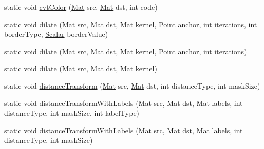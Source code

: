 \begin{DoxyCompactItemize}
static void \mbox{\hyperlink{classorg_1_1opencv_1_1imgproc_1_1_imgproc_ac8a27791c4cc1d1739464acafa3efff6}{cvt\+Color}} (\mbox{\hyperlink{classorg_1_1opencv_1_1core_1_1_mat}{Mat}} src, \mbox{\hyperlink{classorg_1_1opencv_1_1core_1_1_mat}{Mat}} dst, int code)
\item 
static void \mbox{\hyperlink{classorg_1_1opencv_1_1imgproc_1_1_imgproc_a7ed226f2562750987d756b129d3820b2}{dilate}} (\mbox{\hyperlink{classorg_1_1opencv_1_1core_1_1_mat}{Mat}} src, \mbox{\hyperlink{classorg_1_1opencv_1_1core_1_1_mat}{Mat}} dst, \mbox{\hyperlink{classorg_1_1opencv_1_1core_1_1_mat}{Mat}} kernel, \mbox{\hyperlink{classorg_1_1opencv_1_1core_1_1_point}{Point}} anchor, int iterations, int border\+Type, \mbox{\hyperlink{classorg_1_1opencv_1_1core_1_1_scalar}{Scalar}} border\+Value)
\item 
static void \mbox{\hyperlink{classorg_1_1opencv_1_1imgproc_1_1_imgproc_a8f79b910d1d1066ca305b6d1fd86daf0}{dilate}} (\mbox{\hyperlink{classorg_1_1opencv_1_1core_1_1_mat}{Mat}} src, \mbox{\hyperlink{classorg_1_1opencv_1_1core_1_1_mat}{Mat}} dst, \mbox{\hyperlink{classorg_1_1opencv_1_1core_1_1_mat}{Mat}} kernel, \mbox{\hyperlink{classorg_1_1opencv_1_1core_1_1_point}{Point}} anchor, int iterations)
\item 
static void \mbox{\hyperlink{classorg_1_1opencv_1_1imgproc_1_1_imgproc_a596d70c952e5431f7703dc4e17eccf94}{dilate}} (\mbox{\hyperlink{classorg_1_1opencv_1_1core_1_1_mat}{Mat}} src, \mbox{\hyperlink{classorg_1_1opencv_1_1core_1_1_mat}{Mat}} dst, \mbox{\hyperlink{classorg_1_1opencv_1_1core_1_1_mat}{Mat}} kernel)
\item 
static void \mbox{\hyperlink{classorg_1_1opencv_1_1imgproc_1_1_imgproc_a2677a973693b8af87cf9c37e4e6bb55b}{distance\+Transform}} (\mbox{\hyperlink{classorg_1_1opencv_1_1core_1_1_mat}{Mat}} src, \mbox{\hyperlink{classorg_1_1opencv_1_1core_1_1_mat}{Mat}} dst, int distance\+Type, int mask\+Size)
\item 
static void \mbox{\hyperlink{classorg_1_1opencv_1_1imgproc_1_1_imgproc_a5f09765bfd6488e72af786bedf84debb}{distance\+Transform\+With\+Labels}} (\mbox{\hyperlink{classorg_1_1opencv_1_1core_1_1_mat}{Mat}} src, \mbox{\hyperlink{classorg_1_1opencv_1_1core_1_1_mat}{Mat}} dst, \mbox{\hyperlink{classorg_1_1opencv_1_1core_1_1_mat}{Mat}} labels, int distance\+Type, int mask\+Size, int label\+Type)
\item 
static void \mbox{\hyperlink{classorg_1_1opencv_1_1imgproc_1_1_imgproc_ac25a59a395516fc78f9f578605a29c1a}{distance\+Transform\+With\+Labels}} (\mbox{\hyperlink{classorg_1_1opencv_1_1core_1_1_mat}{Mat}} src, \mbox{\hyperlink{classorg_1_1opencv_1_1core_1_1_mat}{Mat}} dst, \mbox{\hyperlink{classorg_1_1opencv_1_1core_1_1_mat}{Mat}} labels, int distance\+Type, int mask\+Size)

\end{DoxyCompactItemize}
